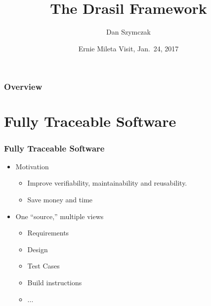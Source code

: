 \documentclass{beamer}
\title[\pgfuseimage{logo}]  %
{The Drasil Framework}
\author[Slide \thepage~of \pageref{TotPages}] %
{Dan Szymczak}
\institute[McMaster University] %
{
  Computing and Software Department\\
  Faculty of Engineering\\
  McMaster University
}
\date[Jan 12, 2016] %
{Ernie Mileta Visit, Jan.\ 24, 2017}
\begin{document}
\begin{frame}

\titlepage

\end{frame}


\begin{frame}

\frametitle{Overview}
\tableofcontents


\end{frame}


\section[FTS]{Fully Traceable Software} %



\begin{frame}

\frametitle{Fully Traceable Software}

\begin{itemize}
\item Motivation
\begin{itemize}
\item Improve verifiability, maintainability and reusability.
\item Save money and time%
\end{itemize}
\item One ``source,'' multiple views
\begin{itemize}
\item Requirements%
\item Design
\item Test Cases
\item Build instructions
\item ...
\end{itemize}
\end{itemize}
\end{frame}
\end{document}
